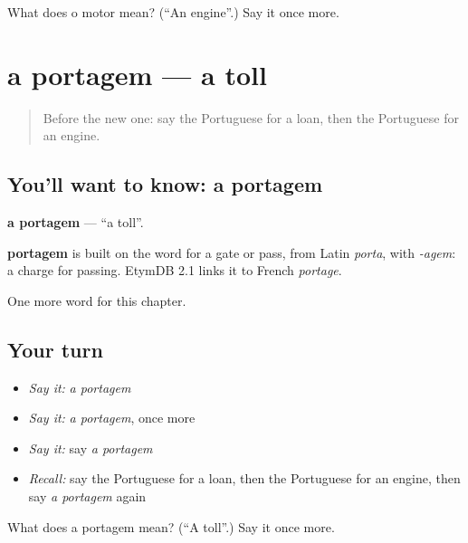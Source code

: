 \begin{tcolorbox}[breakable,colback=teal!4,colframe=teal!35!black,title={Before you move on}]
What does o motor mean? (\textquotedblleft{}An engine\textquotedblright{}.) Say it once more.
\end{tcolorbox}
\section[a portagem]{a portagem — a toll}

\label{lesson:PT-C249-portagem}



\begin{quote}
Before the new one: say the Portuguese for a loan, then the Portuguese for an engine.
\end{quote}

\subsection*{You'll want to know: a portagem}
\textbf{a portagem} — \textquotedblleft{}a toll\textquotedblright{}.

\begin{cousinweb}
\textbf{portagem} is built on the word for a gate or pass, from Latin \emph{porta}, with \emph{-agem}: a charge for passing. EtymDB 2.1 links it to French \emph{portage}.
\end{cousinweb}

\begin{grammarlens}[title={What you've built}]
One more word for this chapter.
\end{grammarlens}

\subsection*{Your turn}
\begin{itemize}
\raggedright
  \item \emph{Say it:} \emph{a portagem}
  \item \emph{Say it:} \emph{a portagem}, once more
  \item \emph{Say it:} say \emph{a portagem}
  \item \emph{Recall:} say the Portuguese for a loan, then the Portuguese for an engine, then say \emph{a portagem} again
\end{itemize}

\begin{tcolorbox}[breakable,colback=teal!4,colframe=teal!35!black,title={Before you move on}]
What does a portagem mean? (\textquotedblleft{}A toll\textquotedblright{}.) Say it once more.
\end{tcolorbox}
